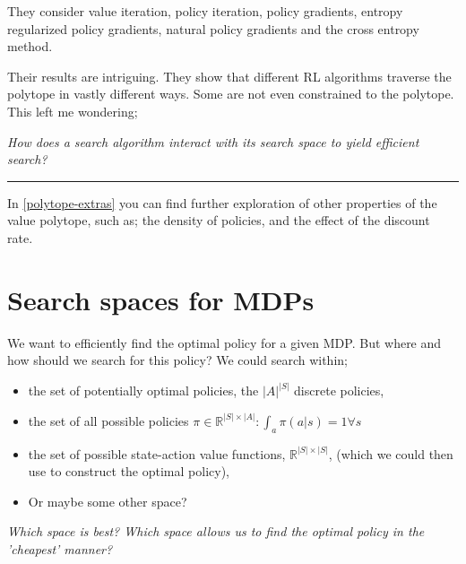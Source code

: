 
They consider value iteration, policy iteration, policy gradients, entropy regularized policy gradients,
natural policy gradients and the cross entropy method.

Their results are intriguing. They show that different RL algorithms traverse the polytope in vastly different ways.
Some are not even constrained to the polytope. This left me wondering;

\begin{displayquote}
  \textsl{How does a search algorithm interact with its search space to yield efficient search?}
\end{displayquote}

\begin{center}\rule{0.5\linewidth}{\linethickness}\end{center}

In \ref{polytope-extras} you can find further exploration of other properties of
the value polytope, such as; the density of policies, and the effect of the discount
rate.

\section{Search spaces for MDPs}\label{search-spaces-mdps}

We want to efficiently find the optimal policy for a given MDP. But where and how should we
search for this policy? We could search within;

\begin{itemize}
\tightlist
  \item the set of potentially optimal policies, the $|A|^{|S|}$ discrete policies,
  \item the set of all possible policies $\pi \in \mathbb R^{|S| \times |A|}: \int_a \pi(a|s) = 1 \forall s $
  \item the set of possible state-action value functions, $\mathbb R^{|S|\times|S|}$,
  (which we could then use to construct the optimal policy),
  \item Or maybe some other space?
\end{itemize}

\begin{displayquote}
  \textsl{Which space is best? Which space allows us to find the optimal policy in the 'cheapest' manner?}
\end{displayquote}


